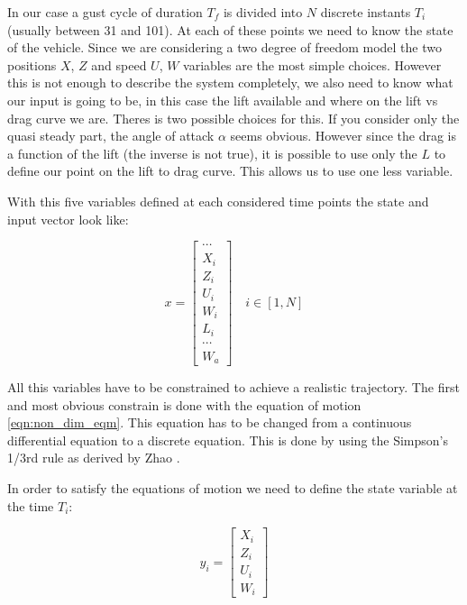     In our case a gust cycle of duration $T_f$ is divided into $N$ discrete instants $T_i$ (usually between 31 and 101).
    At each of these points we need to know the state of the vehicle.
    Since we are considering a two degree of freedom model the two positions $X$, $Z$ and speed $U$, $W$ variables are the most simple choices.
    However this is not enough to describe the system completely, we also need to know what our input is going to be, in this case the lift available and where on the lift vs drag curve we are.
    Theres is two possible choices for this.
    If you consider only the quasi steady part, the angle of attack $\alpha$ seems obvious.
    However since the drag is a function of the lift (the inverse is not true), it is possible to use only the $L$ to define our point on the lift to drag curve.
    This allows us to use one less variable.

    \par With this five variables defined at each considered time points the state and input vector look like:

    \begin{equation}
      x= 
      \begin{bmatrix}
	\cdots \\
	X_i \\
	Z_i \\
	U_i \\
	W_i \\
	L_i \\
	\cdots \\
	W_a
      \end{bmatrix}
      \quad i \in [1,N]
      \label{eqn:big_vector}
    \end{equation}

    \par All this variables have to be constrained to achieve a realistic trajectory.
    The first and most obvious constrain is done with the equation of motion \ref{eqn:non_dim_eqm}.
    This equation has to be changed from a continuous differential equation to a discrete equation.
    This is done by using the Simpson's 1/3rd rule as derived by Zhao \cite{zhao2004optimal}.

    In order to satisfy the equations of motion we need to define the state variable at the time $T_i$:

    \begin{equation}
      y_i= \begin{bmatrix}
	X_i \\
	Z_i \\
	U_i \\
	W_i 
      \end{bmatrix}
      \label{eqn:state_i}
    \end{equation}

